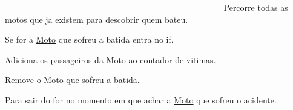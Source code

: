 ~\newline
~\newline
~\newline
~\newline
~\newline
~\newline
~\newline
~\newline
~\newline
~\newline
~\newline
~\newline
~\newline
~\newline
~\newline
~\newline
~\newline
~\newline
~\newline
~\newline
~\newline
~\newline
~\newline
~\newline
~\newline
~\newline
~\newline
~\newline
~\newline
~\newline
~\newline
 Percorre todas as motos que ja existem para descobrir quem bateu.

Se for a \mbox{\hyperlink{class_moto}{Moto}} que sofreu a batida entra no if.

Adiciona os passageiros da \mbox{\hyperlink{class_moto}{Moto}} ao contador de vitimas.

Remove o \mbox{\hyperlink{class_moto}{Moto}} que sofreu a batida.

Para sair do for no momento em que achar a \mbox{\hyperlink{class_moto}{Moto}} que sofreu o acidente.


